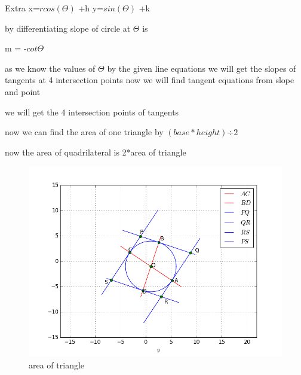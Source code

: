 \documentclass[17pt]{beamer}
\begin{document}
\begin{frame}[t]{Extra}
x=$rcos(\Theta)$ +h
y=$sin(\Theta)$ +k

by differentiating
slope of circle at $\Theta$ is

m = -$cot\Theta$

as we know the values of $\Theta$ by the given line equations
we will get the slopes of tangents at 4 intersection points
 now we will find tangent equations from slope and point
 
\end{frame}
\begin{frame}
we will get the 4 intersection points of tangents 

now we can find the area of one triangle by $(base *height)$$\div2$

now the area of quadrilateral is 2*area of triangle
\end{frame}
 \begin{frame}
 \begin{figure}[b]
\centering
\includegraphics[width=1\textwidth]{wowd.png}
\caption{area of triangle}
\end{figure}
\end{frame}
\end{document}
